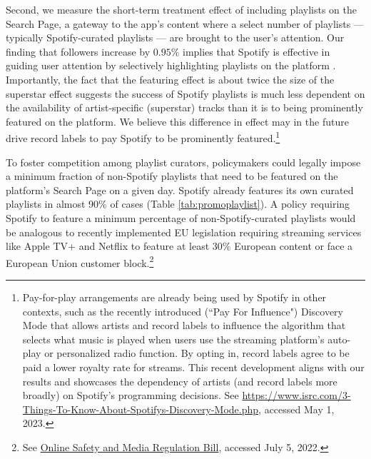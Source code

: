 Second, we measure the short-term treatment effect of including playlists on the Search Page, a gateway to the app’s content where a select number of playlists --- typically Spotify-curated playlists --- are brought to the user's attention. Our finding that followers increase by $0.95\%$ implies that Spotify is effective in guiding user attention by selectively highlighting playlists on the platform \citep[e.g., ][]{goldfarb_tucker_2019}. Importantly, the fact that the featuring effect is about twice the size of the superstar effect suggests the success of Spotify playlists is much less dependent on the availability of artist-specific (superstar) tracks than it is to being prominently featured on the platform. We believe this difference in effect may in the future drive record labels to pay Spotify to be prominently featured.\footnote{Pay-for-play arrangements are already being used by Spotify in other contexts, such as the recently introduced (``Pay For Influence") Discovery Mode that allows artists and record labels to influence the algorithm that selects what music is played when users use the streaming platform's auto-play or personalized radio function. By opting in, record labels agree to be paid a lower royalty rate for streams. This recent development aligns with our results and showcases the dependency of artists (and record labels more broadly) on Spotify's programming decisions. See \href{https://www.isrc.com/3-Things-To-Know-About-Spotifys-Discovery-Mode.php}{https://www.isrc.com/3-Things-To-Know-About-Spotifys-Discovery-Mode.php}, accessed May 1, 2023.}  

To foster competition among playlist curators, policymakers could legally impose a minimum fraction of non-Spotify playlists that need to be featured on the platform's Search Page on a given day. 
Spotify already features its own curated playlists in almost 90\% of cases (Table \ref{tab:promoplaylist}). A policy requiring Spotify to feature a minimum percentage of non-Spotify-curated playlists would be analogous to recently implemented EU legislation requiring streaming services like Apple TV+ and Netflix to feature at least $30\%$ European content or face a European Union customer block.\footnote{See \href{https://www.gov.ie/en/publication/d8e4c-online-safety-and-media-regulation-bill/}{Online Safety and Media Regulation Bill}, accessed July 5, 2022.}

